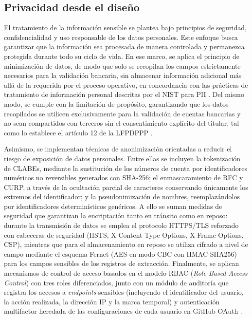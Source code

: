 \subsection{Privacidad desde el diseño}

El tratamiento de la información sensible se plantea bajo principios de seguridad, confidencialidad y uso responsable de los datos personales. Este enfoque busca garantizar que la información sea procesada de manera controlada y permanezca protegida durante todo su ciclo de vida. En ese marco, se aplica el principio de minimización de datos, de modo que solo se recopilan los campos estrictamente necesarios para la validación bancaria, sin almacenar información adicional más allá de la requerida por el proceso operativo, en concordancia con las prácticas de tratamiento de información personal descritas por el NIST para PII \cite{nist_pii}. Del mismo modo, se cumple con la limitación de propósito, garantizando que los datos recopilados se utilicen exclusivamente para la validación de cuentas bancarias y no sean compartidos con terceros sin el consentimiento explícito del titular, tal como lo establece el artículo 12 de la LFPDPPP \cite{lfpdppp}.

Asimismo, se implementan técnicas de anonimización orientadas a reducir el riesgo de exposición de datos personales. Entre ellas se incluyen la tokenización de CLABEs, mediante la sustitución de los números de cuenta por identificadores numéricos no reversibles generados con SHA-256; el enmascaramiento de RFC y CURP, a través de la ocultación parcial de caracteres conservando únicamente los extremos del identificador; y la pseudonimización de nombres, reemplazándolos por identificadores determinísticos genéricos. A ello se suman medidas de seguridad que garantizan la encriptación tanto en tránsito como en reposo: durante la transmisión de datos se emplea el protocolo HTTPS/TLS reforzado con cabeceras de seguridad (HSTS, X-Content-Type-Options, X-Frame-Options, CSP), mientras que para el almacenamiento en reposo se utiliza cifrado a nivel de campo mediante el esquema Fernet (AES en modo CBC con HMAC-SHA256) para los campos sensibles de los registros de extracción. Finalmente, se aplican mecanismos de control de acceso basados en el modelo RBAC (\textit{Role-Based Access Control}) con tres roles diferenciados, junto con un módulo de auditoría que registra los accesos a \textit{endpoints} sensibles (incluyendo el identificador del usuario, la acción realizada, la dirección IP y la marca temporal) y autenticación multifactor heredada de las configuraciones de cada usuario en GitHub OAuth \cite{nist_pii}.\vspace{-1.8em}

